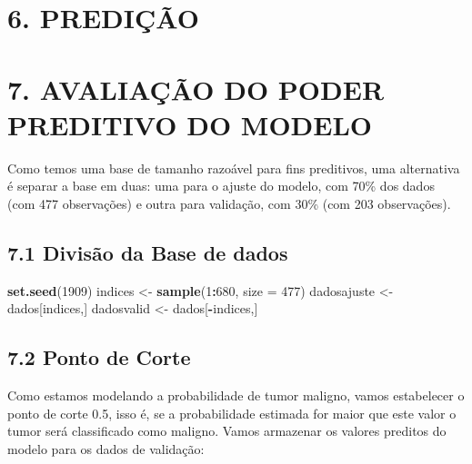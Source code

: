 \documentclass[
]{article}
\newenvironment{Shaded}{\begin{snugshade}}{\end{snugshade}}
\newcommand{\DataTypeTok}[1]{\textcolor[rgb]{0.13,0.29,0.53}{#1}}
\newcommand{\DecValTok}[1]{\textcolor[rgb]{0.00,0.00,0.81}{#1}}
\newcommand{\KeywordTok}[1]{\textcolor[rgb]{0.13,0.29,0.53}{\textbf{#1}}}
\newcommand{\NormalTok}[1]{#1}
\newcommand{\OperatorTok}[1]{\textcolor[rgb]{0.81,0.36,0.00}{\textbf{#1}}}
\newcommand{\StringTok}[1]{\textcolor[rgb]{0.31,0.60,0.02}{#1}}
\begin{document}
\hypertarget{prediuxe7uxe3o}{%
\section{6. PREDIÇÃO}\label{prediuxe7uxe3o}}

\hypertarget{avaliauxe7uxe3o-do-poder-preditivo-do-modelo}{%
\section{7. AVALIAÇÃO DO PODER PREDITIVO DO
MODELO}\label{avaliauxe7uxe3o-do-poder-preditivo-do-modelo}}

Como temos uma base de tamanho razoável para fins preditivos, uma
alternativa é separar a base em duas: uma para o ajuste do modelo, com
70\% dos dados (com 477 observações) e outra para validação, com 30\%
(com 203 observações).

\hypertarget{divisuxe3o-da-base-de-dados}{%
\subsection{\texorpdfstring{\textbf{7.1 Divisão da Base de
dados}}{7.1 Divisão da Base de dados}}\label{divisuxe3o-da-base-de-dados}}

\begin{Shaded}
\begin{Highlighting}[]
\KeywordTok{set.seed}\NormalTok{(}\DecValTok{1909}\NormalTok{)}
\NormalTok{indices <-}\StringTok{ }\KeywordTok{sample}\NormalTok{(}\DecValTok{1}\OperatorTok{:}\DecValTok{680}\NormalTok{, }\DataTypeTok{size =} \DecValTok{477}\NormalTok{) }
\NormalTok{dadosajuste <-}\StringTok{ }\NormalTok{dados[indices,]}
\NormalTok{dadosvalid <-}\StringTok{ }\NormalTok{dados[}\OperatorTok{-}\NormalTok{indices,]}
\end{Highlighting}
\end{Shaded}

\hypertarget{ponto-de-corte}{%
\subsection{\texorpdfstring{\textbf{7.2 Ponto de
Corte}}{7.2 Ponto de Corte}}\label{ponto-de-corte}}

Como estamos modelando a probabilidade de tumor maligno, vamos
estabelecer o ponto de corte 0.5, isso é, se a probabilidade estimada
for maior que este valor o tumor será classificado como maligno. Vamos
armazenar os valores preditos do modelo para os dados de validação:
\end{document}

